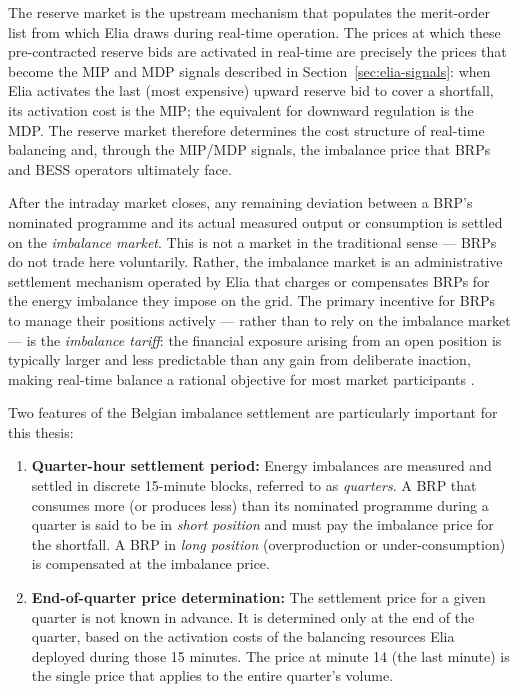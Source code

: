The reserve market is the upstream mechanism that populates the merit-order list from which Elia draws during real-time operation. The prices at which these pre-contracted reserve bids are activated in real-time are precisely the prices that become the MIP and MDP signals described in Section~\ref{sec:elia-signals}: when Elia activates the last (most expensive) upward reserve bid to cover a shortfall, its activation cost is the MIP; the equivalent for downward regulation is the MDP. The reserve market therefore determines the cost structure of real-time balancing and, through the MIP/MDP signals, the imbalance price that BRPs and BESS operators ultimately face.
\label{sec:balancing-market}

After the intraday market closes, any remaining deviation between a BRP's nominated programme and its actual measured output or consumption is settled on the \textit{imbalance market}. This is not a market in the traditional sense — BRPs do not trade here voluntarily. Rather, the imbalance market is an administrative settlement mechanism operated by Elia that charges or compensates BRPs for the energy imbalance they impose on the grid. The primary incentive for BRPs to manage their positions actively — rather than to rely on the imbalance market — is the \textit{imbalance tariff}: the financial exposure arising from an open position is typically larger and less predictable than any gain from deliberate inaction, making real-time balance a rational objective for most market participants \cite{[search: Elia day-ahead balance obligation BRP study 2020 Belgium imbalance tariff]}.

Two features of the Belgian imbalance settlement are particularly important for this thesis:

\begin{enumerate}
    \item \textbf{Quarter-hour settlement period:} Energy imbalances are measured and settled in discrete 15-minute blocks, referred to as \textit{quarters}. A BRP that consumes more (or produces less) than its nominated programme during a quarter is said to be in \textit{short position} and must pay the imbalance price for the shortfall. A BRP in \textit{long position} (overproduction or under-consumption) is compensated at the imbalance price.
    \item \textbf{End-of-quarter price determination:} The settlement price for a given quarter is not known in advance. It is determined only at the end of the quarter, based on the activation costs of the balancing resources Elia deployed during those 15 minutes. The price at minute 14 (the last minute) is the single price that applies to the entire quarter's volume.
\end{enumerate}


